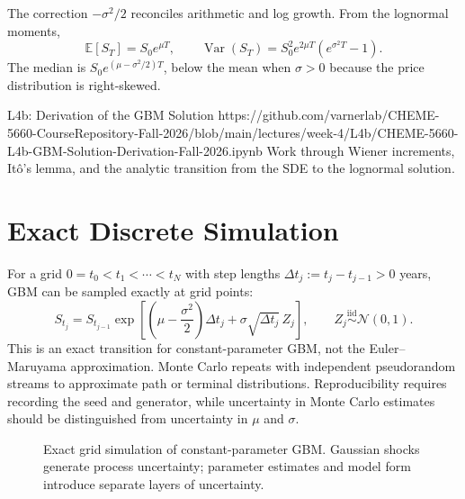 \documentclass[11pt]{article}
\newcommand{\E}{\mathbb{E}}
\newcommand{\Var}{\operatorname{Var}}
\begin{document}
The correction $-\sigma^2/2$ reconciles arithmetic and log growth. From the lognormal moments,
\begin{equation}
  \label{eq:gbm-moments}
  \E[S_T]=S_0e^{\mu T},
  \qquad
  \Var(S_T)=S_0^2e^{2\mu T}\left(e^{\sigma^2T}-1\right).
\end{equation}
The median is $S_0e^{(\mu-\sigma^2/2)T}$, below the mean when $\sigma>0$ because the price distribution is right-skewed.

\notebooklink
  {L4b: Derivation of the GBM Solution}
  {https://github.com/varnerlab/CHEME-5660-CourseRepository-Fall-2026/blob/main/lectures/week-4/L4b/CHEME-5660-L4b-GBM-Solution-Derivation-Fall-2026.ipynb}
  {Work through Wiener increments, It\^o's lemma, and the analytic transition from the SDE to the lognormal solution.}

\section{Exact Discrete Simulation}

For a grid $0=t_0<t_1<\cdots<t_N$ with step lengths $\Delta t_j:=t_j-t_{j-1}>0$ years, GBM can be sampled exactly at grid points:
\begin{equation}
  \label{eq:exact-step}
  S_{t_j}=S_{t_{j-1}}
  \exp\!\left[
  \left(\mu-\frac{\sigma^2}{2}\right)\Delta t_j
  +\sigma\sqrt{\Delta t_j}\,Z_j
  \right],
  \qquad Z_j\overset{\mathrm{iid}}{\sim}\mathcal{N}(0,1).
\end{equation}
This is an exact transition for constant-parameter GBM, not the Euler--Maruyama approximation. Monte Carlo repeats  with independent pseudorandom streams to approximate path or terminal distributions. Reproducibility requires recording the seed and generator, while uncertainty in Monte Carlo estimates should be distinguished from uncertainty in $\mu$ and $\sigma$.

\begin{figure}[ht]
  \centering
  \caption{Exact grid simulation of constant-parameter GBM. Gaussian shocks generate process uncertainty; parameter estimates and model form introduce separate layers of uncertainty.}
  \label{fig:gbm-simulation}
\end{figure}
\end{document}
